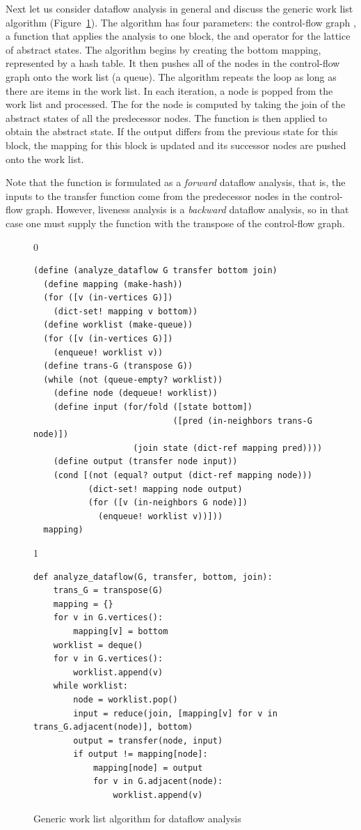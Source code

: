 \documentclass[7x10]{TimesAPriori_MIT}%
\def\racketEd{0}
\def\pythonEd{1}
\def\edition{1}
\begin{document}
Next let us consider dataflow analysis in general and discuss the
generic work list algorithm (Figure~\ref{fig:generic-dataflow}).
%
The algorithm has four parameters: the control-flow graph , a
function  that applies the analysis to one block, the
 and  operator for the lattice of abstract
states.  The algorithm begins by creating the bottom mapping,
represented by a hash table.  It then pushes all of the nodes in the
control-flow graph onto the work list (a queue). The algorithm repeats
the  loop as long as there are items in the work list. In
each iteration, a node is popped from the work list and processed. The
 for the node is computed by taking the join of the
abstract states of all the predecessor nodes. The 
function is then applied to obtain the  abstract
state. If the output differs from the previous state for this block,
the mapping for this block is updated and its successor nodes are
pushed onto the work list.

Note that the  function is formulated as a
\emph{forward} dataflow analysis, that is, the inputs to the transfer
function come from the predecessor nodes in the control-flow
graph. However, liveness analysis is a \emph{backward} dataflow
analysis, so in that case one must supply the 
function with the transpose of the control-flow graph.

\begin{figure}[tb]
{\if\edition\racketEd    
\begin{lstlisting}
(define (analyze_dataflow G transfer bottom join)
  (define mapping (make-hash))
  (for ([v (in-vertices G)])
    (dict-set! mapping v bottom))
  (define worklist (make-queue))
  (for ([v (in-vertices G)])
    (enqueue! worklist v))
  (define trans-G (transpose G))
  (while (not (queue-empty? worklist))
    (define node (dequeue! worklist)) 
    (define input (for/fold ([state bottom])
                            ([pred (in-neighbors trans-G node)])
                    (join state (dict-ref mapping pred))))
    (define output (transfer node input))
    (cond [(not (equal? output (dict-ref mapping node)))
           (dict-set! mapping node output)
           (for ([v (in-neighbors G node)])
             (enqueue! worklist v))]))
  mapping)
\end{lstlisting}
\fi}
{\if\edition\pythonEd
\begin{lstlisting}
def analyze_dataflow(G, transfer, bottom, join):
    trans_G = transpose(G)
    mapping = {}
    for v in G.vertices():
        mapping[v] = bottom
    worklist = deque()
    for v in G.vertices():
        worklist.append(v)
    while worklist:
        node = worklist.pop()
        input = reduce(join, [mapping[v] for v in trans_G.adjacent(node)], bottom)
        output = transfer(node, input)
        if output != mapping[node]:
            mapping[node] = output
            for v in G.adjacent(node):
                worklist.append(v)
\end{lstlisting}
\fi}
\caption{Generic work list algorithm for dataflow analysis}
  \label{fig:generic-dataflow}
\end{figure}
\end{document}

